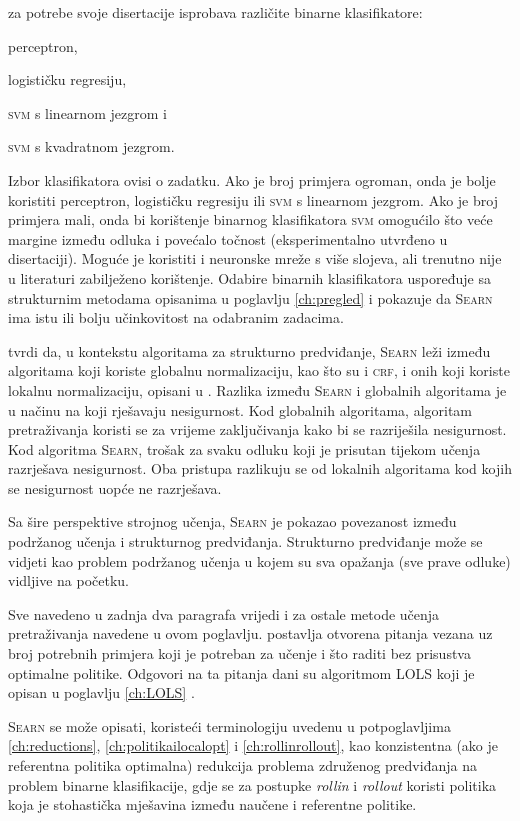\citeauthor{daume06thesis} za potrebe svoje disertacije isprobava različite
binarne klasifikatore:
\begin{inlinelist}
  \item perceptron,
  \item logističku regresiju,
  \item \textsc{svm} s linearnom jezgrom i
  \item \textsc{svm} s kvadratnom jezgrom.
\end{inlinelist}
Izbor klasifikatora ovisi o zadatku. Ako je broj primjera ogroman, onda je bolje
koristiti perceptron, logističku regresiju ili \textsc{svm} s linearnom jezgrom.
Ako je broj primjera mali, onda bi korištenje binarnog klasifikatora
\textsc{svm} omogućilo što veće margine između odluka i povećalo točnost
(eksperimentalno utvrđeno u disertaciji). Moguće je koristiti i neuronske mreže
s više slojeva, ali trenutno nije u literaturi zabilježeno korištenje. Odabire
binarnih klasifikatora \citeauthor{daume06thesis} uspoređuje sa strukturnim
metodama opisanima u poglavlju \ref{ch:pregled} i pokazuje da \textsc{Searn} ima
istu ili bolju učinkovitost na odabranim zadacima.

\citeauthor{daume06thesis} tvrdi da, u kontekstu algoritama za strukturno
predviđanje, \textsc{Searn} leži između algoritama koji koriste globalnu
normalizaciju, kao što su \mmmm{} i \textsc{crf}, i onih koji koriste lokalnu
normalizaciju, opisani u \citep{punyakanok2001use}. Razlika između
\textsc{Searn} i globalnih algoritama je u načinu na koji rješavaju nesigurnost.
Kod globalnih algoritama, algoritam pretraživanja koristi se za vrijeme
zaključivanja kako bi se razriješila nesigurnost. Kod algoritma \textsc{Searn},
trošak za svaku odluku koji je prisutan tijekom učenja razrješava nesigurnost.
Oba pristupa razlikuju se od lokalnih algoritama kod kojih se nesigurnost uopće
ne razrješava.

Sa šire perspektive strojnog učenja, \textsc{Searn} je pokazao povezanost između
podržanog učenja i strukturnog predviđanja. Strukturno predviđanje može se
vidjeti kao problem podržanog učenja u kojem su sva opažanja (sve prave odluke)
vidljive na početku.

Sve navedeno u zadnja dva paragrafa vrijedi i za ostale metode učenja
pretraživanja navedene u ovom poglavlju. \citeauthor{daume06thesis} postavlja
otvorena pitanja vezana uz broj potrebnih primjera koji je potreban za učenje i
što raditi bez prisustva optimalne politike. Odgovori na ta pitanja dani su
algoritmom \textsc{LOLS} koji je opisan u poglavlju \ref{ch:LOLS}
\citep{daume15lols}.

\textsc{Searn} se može opisati, koristeći terminologiju uvedenu u potpoglavljima
\ref{ch:reductions}, \ref{ch:politikailocalopt} i \ref{ch:rollinrollout}, kao
konzistentna (ako je referentna politika optimalna) redukcija problema združenog
predviđanja na problem binarne klasifikacije, gdje se za postupke
\textit{rollin} i \textit{rollout} koristi politika koja je stohastička
mješavina između naučene i referentne politike.
